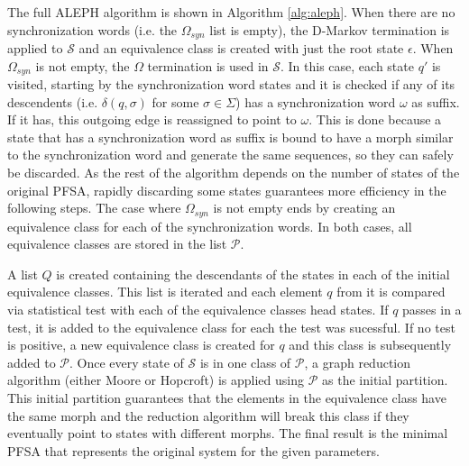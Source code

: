 {The full ALEPH algorithm is shown in Algorithm \ref{alg:aleph}. When there are no synchronization words (i.e. the $\Omega_{syn}$ list is empty), the D-Markov termination is applied to $\mathcal{S}$ and an equivalence class is created with just the root state $\epsilon$. When $\Omega_{syn}$ is not empty, the $\Omega$ termination is used in $\mathcal{S}$. In this case, each state $q'$ is visited, starting by the synchronization word states and it is checked if any of its descendents (i.e. $\delta(q,\sigma)$ for some $\sigma \in \Sigma$) has a synchronization word $\omega$ as suffix. If it has, this outgoing edge is reassigned to point to $\omega$. This is done because a state that has a synchronization word as suffix is bound to have a morph similar to the synchronization word and generate the same sequences, so they can safely be discarded. As the rest of the algorithm depends on the number of states of the original PFSA, rapidly discarding some states guarantees more efficiency in the following steps. The case where $\Omega_{syn}$ is not empty ends by creating an equivalence class for each of the synchronization words. In both cases, all equivalence classes are stored in the list $\mathcal{P}$. 

A list $Q$ is created containing the descendants of the states in each of the initial equivalence classes. This list is iterated and each element $q$ from it is compared via statistical test with each of the equivalence classes head states. If $q$ passes in a test, it is added to the equivalence class for each the test was sucessful. If no test is positive, a new equivalence class is created for $q$ and this class is subsequently added to $\mathcal{P}$. Once every state of $\mathcal{S}$ is in one class of $\mathcal{P}$, a graph reduction algorithm (either Moore or Hopcroft) is applied using $\mathcal{P}$ as the initial partition. This initial partition guarantees that the elements in the equivalence class have the same morph and the reduction algorithm will break this class if they eventually point to states with different morphs.  The final result is the minimal PFSA that represents the original system for the given parameters.  

}

